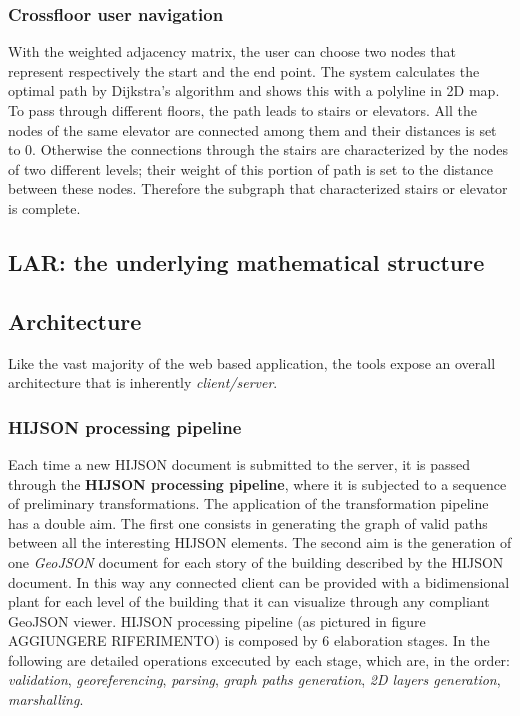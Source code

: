 \documentclass{sig-alternate}
\begin{document}
\subsubsection{Crossfloor user navigation}\label{crossfloor-user-navigation}

With the weighted adjacency matrix, the user can choose two nodes that represent respectively the start and the end point. The system calculates the optimal path by Dijkstra's algorithm and shows this with a polyline in 2D map. To pass through different floors, the path leads to stairs or elevators. All the nodes of the same elevator are connected among them and their distances is set to 0. Otherwise the connections through the stairs are characterized by the nodes of two different levels; their weight of this portion of path is set to the distance between these nodes. Therefore the subgraph that characterized stairs or elevator is complete.

\subsection{LAR: the underlying mathematical structure}\label{lar-the-underlying-mathematical-structure}

\subsection{Architecture}\label{architecture}

Like the vast majority of the web based application, the tools expose an overall architecture that is inherently \emph{client/server}.

\subsubsection{HIJSON processing pipeline}\label{hijson-processing-pipeline}

Each time a new HIJSON document is submitted to the server, it is passed through the \textbf{HIJSON processing pipeline}, where it is subjected to a sequence of preliminary transformations. The application of the transformation pipeline has a double aim. The first one consists in generating the graph of valid paths between all the interesting HIJSON elements. The second aim is the generation of one \emph{GeoJSON} document for each story of the building described by the HIJSON document. In this way any connected client can be provided with a bidimensional plant for each level of the building that it can visualize through any compliant GeoJSON viewer. HIJSON processing pipeline (as pictured in figure AGGIUNGERE RIFERIMENTO) is composed by 6 elaboration stages. In the following are detailed operations excecuted by each stage, which are, in the order: \emph{validation}, \emph{georeferencing}, \emph{parsing}, \emph{graph paths generation}, \emph{2D layers generation}, \emph{marshalling}.
\end{document}
